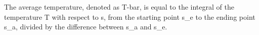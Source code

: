 The average temperature, denoted as T-bar, is equal to the integral of the temperature T with respect to s, from the starting point s_e to the ending point s_a, divided by the difference between s_a and s_e.